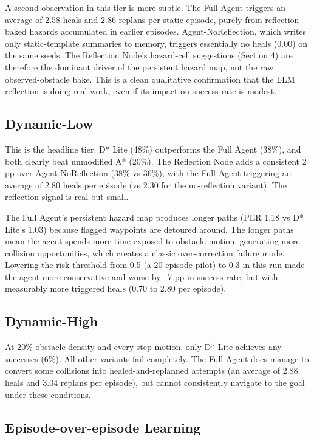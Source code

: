 \documentclass[11pt, letterpaper]{article}
\begin{document}
A second observation in this tier is more subtle. The Full Agent triggers an average of 2.58 heals and 2.86 replans per static episode, purely from reflection-baked hazards accumulated in earlier episodes. Agent-NoReflection, which writes only static-template summaries to memory, triggers essentially no heals (0.00) on the same seeds. The Reflection Node's hazard-cell suggestions (Section 4) are therefore the dominant driver of the persistent hazard map, not the raw observed-obstacle bake. This is a clean qualitative confirmation that the LLM reflection is doing real work, even if its impact on success rate is modest.

\subsection{Dynamic-Low}
This is the headline tier. D* Lite (48\%) outperforms the Full Agent (38\%), and both clearly beat unmodified A* (20\%). The Reflection Node adds a consistent 2 pp over Agent-NoReflection (38\% vs 36\%), with the Full Agent triggering an average of 2.80 heals per episode (vs 2.30 for the no-reflection variant). The reflection signal is real but small.

The Full Agent's persistent hazard map produces longer paths (PER 1.18 vs D* Lite's 1.03) because flagged waypoints are detoured around. The longer paths mean the agent spends more time exposed to obstacle motion, generating more collision opportunities, which creates a classic over-correction failure mode. Lowering the risk threshold from 0.5 (a 20-episode pilot) to 0.3 in this run made the agent more conservative and worse by ~7 pp in success rate, but with measurably more triggered heals (0.70 to 2.80 per episode).

\subsection{Dynamic-High}
At 20\% obstacle density and every-step motion, only D* Lite achieves any successes (6\%). All other variants fail completely. The Full Agent does manage to convert some collisions into healed-and-replanned attempts (an average of 2.88 heals and 3.04 replans per episode), but cannot consistently navigate to the goal under these conditions.

\subsection{Episode-over-episode Learning}
\end{document}
